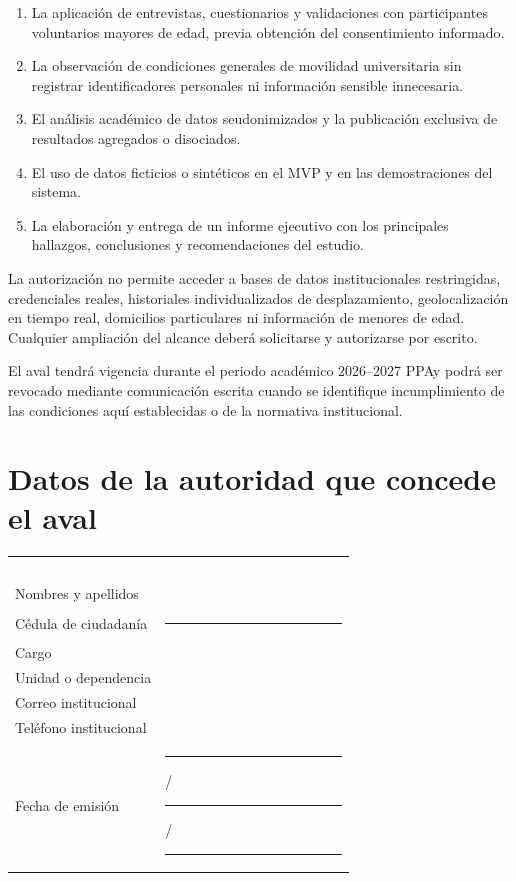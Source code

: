 \documentclass[11pt,a4paper]{article}
\newcommand{\Periodo}{2026--2027 PPA}
\begin{document}
\begin{enumerate}[leftmargin=1.6em,itemsep=2pt]
  \item La aplicación de entrevistas, cuestionarios y validaciones con participantes voluntarios mayores de edad, previa obtención del consentimiento informado.
  \item La observación de condiciones generales de movilidad universitaria sin registrar identificadores personales ni información sensible innecesaria.
  \item El análisis académico de datos seudonimizados y la publicación exclusiva de resultados agregados o disociados.
  \item El uso de datos ficticios o sintéticos en el MVP y en las demostraciones del sistema.
  \item La elaboración y entrega de un informe ejecutivo con los principales hallazgos, conclusiones y recomendaciones del estudio.
\end{enumerate}

La autorización no permite acceder a bases de datos institucionales restringidas, credenciales reales, historiales individualizados de desplazamiento, geolocalización en tiempo real, domicilios particulares ni información de menores de edad. Cualquier ampliación del alcance deberá solicitarse y autorizarse por escrito.

El aval tendrá vigencia durante el periodo académico \Periodo y podrá ser revocado mediante comunicación escrita cuando se identifique incumplimiento de las condiciones aquí establecidas o de la normativa institucional.

\section{Datos de la autoridad que concede el aval}

\noindent\begin{tabularx}{\textwidth}{L{5.0cm} Y}
\textcolor{white}{\textbf{Dato requerido}} & \textcolor{white}{\textbf{Información institucional}}\\
Nombres y apellidos & \hrulefill\\
Cédula de ciudadanía & \rule{6.5cm}{0.4pt}\\
Cargo & \hrulefill\\
Unidad o dependencia & \hrulefill\\
Correo institucional & \hrulefill\\
Teléfono institucional & \hrulefill\\
Fecha de emisión & \rule{1.2cm}{0.4pt} / \rule{1.2cm}{0.4pt} / \rule{2.0cm}{0.4pt}\\
\end{tabularx}
\end{document}
